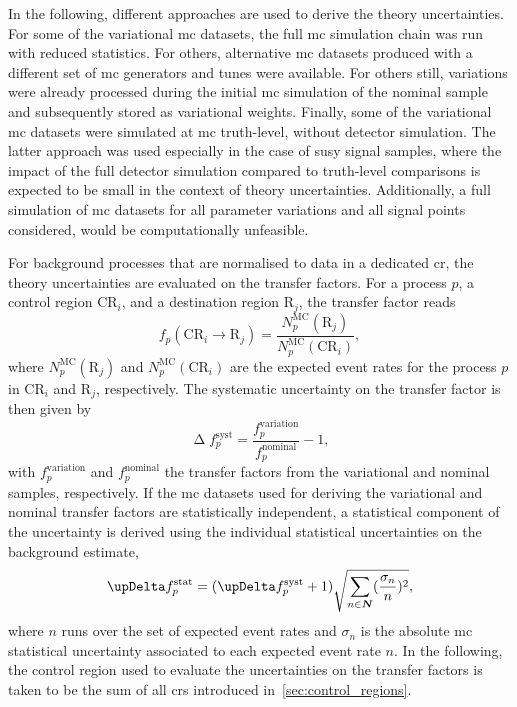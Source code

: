 In the following, different approaches are used to derive the theory uncertainties.
For some of the variational \gls{mc} datasets, the full \gls{mc} simulation chain was run with reduced statistics.
For others, alternative \gls{mc} datasets produced with a different set of \gls{mc} generators and tunes were available.
For others still, variations were already processed during the initial \gls{mc} simulation of the nominal sample and subsequently stored as variational weights.
Finally, some of the variational \gls{mc} datasets were simulated at \gls{mc} truth-level, \ie without detector simulation.
The latter approach was used especially in the case of \gls{susy} signal samples, where the impact of the full detector simulation compared to truth-level comparisons is expected to be small in the context of theory uncertainties.
Additionally, a full simulation of \gls{mc} datasets for all parameter variations and all signal points considered, would be computationally unfeasible. 

For background processes that are normalised to data in a dedicated \gls{cr}, the theory uncertainties are evaluated on the transfer factors.
For a process $p$, a control region CR$_i$, and a destination region R$_j$, the transfer factor reads
\begin{equation}
	f_p(\mathrm{CR}_i\rightarrow \mathrm{R}_j) = \frac{N^\mathrm{MC}_p(\mathrm{R}_j)}{N^\mathrm{MC}_p(\mathrm{CR}_i)},
\end{equation}
where $N^\mathrm{MC}_p(\mathrm{R}_j)$ and $N^\mathrm{MC}_p(\mathrm{CR}_i)$ are the expected event rates for the process $p$ in CR$_i$ and R$_j$, respectively. The systematic uncertainty on the transfer factor is then given by
\begin{equation}
	\upDelta f_p^\mathrm{syst} = \frac{f_p^\mathrm{variation}}{f_p^\mathrm{nominal}} - 1,
\end{equation}
with $f_p^\mathrm{variation}$ and $f_p^\mathrm{nominal}$ the transfer factors from the variational and nominal samples, respectively.
If the \gls{mc} datasets used for deriving the variational and nominal transfer factors are statistically independent, a statistical component of the uncertainty is derived using the individual statistical uncertainties on the background estimate,
\begin{equation}
	\upDelta f_p^\mathrm{stat} = (\upDelta f_p^\mathrm{syst} + 1 ) \sqrt{\sum_{n\in\makemebold{N}}(\frac{\sigma_n}{n})^2},
\end{equation}
 where $n$ runs over the set of expected event rates and $\sigma_n$ is the absolute \gls{mc} statistical uncertainty associated to each expected event rate $n$.
 In the following, the control region used to evaluate the uncertainties on the transfer factors is taken to be the sum of all \glspl{cr} introduced in~\cref{sec:control_regions}.
  
